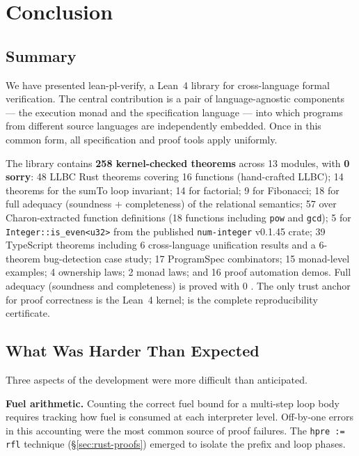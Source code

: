 
\section{Conclusion}
\label{sec:conclusion}

\subsection{Summary}

We have presented lean-pl-verify, a Lean~4 library for cross-language formal
verification. The central contribution is a pair of language-agnostic components
— the \RustM execution monad and the \ProgramSpec specification language — into
which programs from different source languages are independently embedded. Once
in this common form, all specification and proof tools apply uniformly.

The library contains \textbf{258 kernel-checked theorems} across 13 modules,
with \textbf{0 sorry}:
48 LLBC Rust theorems covering 16 functions (hand-crafted LLBC);
14 theorems for the sumTo loop invariant;
14 for factorial; 9 for Fibonacci;
18 for full adequacy (soundness + completeness) of the relational semantics;
57 over Charon-extracted function definitions (18 functions including \texttt{pow} and \texttt{gcd});
5 for \texttt{Integer::is\_even<u32>} from the published \texttt{num-integer} v0.1.45 crate;
39 TypeScript theorems including 6 cross-language unification results
and a 6-theorem bug-detection case study;
17 ProgramSpec combinators; 15 monad-level examples; 4 ownership laws;
2 monad laws; and 16 proof automation demos.
Full adequacy (soundness and completeness) is proved with 0 \sorry.
The only trust anchor for proof correctness is the Lean~4 kernel;
 is the complete reproducibility certificate.

\subsection{What Was Harder Than Expected}

Three aspects of the development were more difficult than anticipated.

\textbf{Fuel arithmetic.} Counting the correct fuel bound for a multi-step
loop body requires tracking how fuel is consumed at each interpreter level.
Off-by-one errors in this accounting were the most common source of proof
failures. The \texttt{hpre := rfl} technique (\S\ref{sec:rust-proofs})
emerged to isolate the prefix and loop phases.

